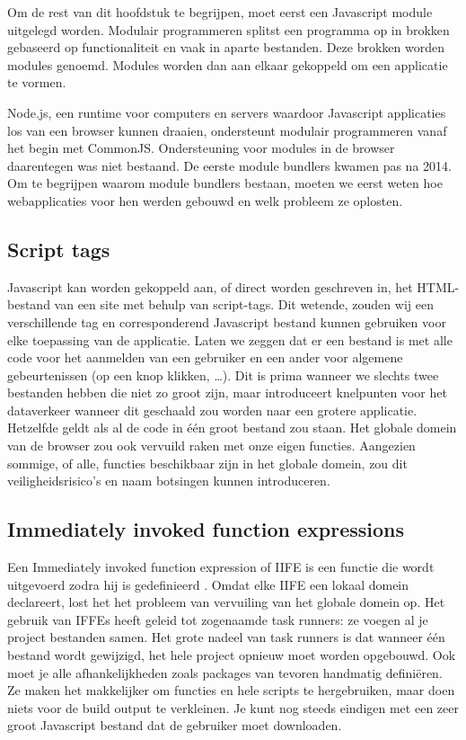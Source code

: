 Om de rest van dit hoofdstuk te begrijpen, moet eerst een \gls{Javascript} module uitgelegd worden. Modulair programmeren splitst een programma op in brokken gebaseerd op functionaliteit en vaak in aparte bestanden. Deze brokken worden modules genoemd. Modules worden dan aan elkaar gekoppeld om een applicatie te vormen. \autocite{webpack-no-dateB} \autocite{mozilla-2021A}

Node.js, een runtime voor computers en servers waardoor \gls{Javascript} applicaties los van een browser kunnen draaien, ondersteunt modulair programmeren vanaf het begin met CommonJS. Ondersteuning voor modules in de browser daarentegen was niet bestaand. De eerste module bundlers kwamen pas na 2014. Om te begrijpen waarom module bundlers bestaan, moeten we eerst weten hoe webapplicaties voor hen werden gebouwd en welk probleem ze oplosten. \autocite{webpack-no-dateA}

\subsection{Script tags}

\gls{Javascript} kan worden gekoppeld aan, of direct worden geschreven in, het \gls{HTML}-bestand van een site met behulp van script-tags. Dit wetende, zouden wij een verschillende tag en corresponderend \gls{Javascript} bestand kunnen gebruiken voor elke toepassing van de applicatie. Laten we zeggen dat er een bestand is met alle code voor het aanmelden van een gebruiker en een ander voor algemene gebeurtenissen (op een knop klikken, \ldots). Dit is prima wanneer we slechts twee bestanden hebben die niet zo groot zijn, maar introduceert knelpunten voor het dataverkeer wanneer dit geschaald zou worden naar een grotere applicatie. Hetzelfde geldt als al de code in één groot bestand zou staan. Het globale domein van de browser zou ook vervuild raken met onze eigen functies. Aangezien sommige, of alle, functies beschikbaar zijn in het globale domein, zou dit veiligheidsrisico's en naam botsingen kunnen introduceren. 



\subsection{Immediately invoked function expressions}

Een Immediately invoked function expression of IIFE is een functie die wordt uitgevoerd zodra hij is gedefinieerd \autocite{mozilla-2021B}. Omdat elke IIFE een lokaal domein declareert, lost het het probleem van vervuiling van het globale domein op. Het gebruik van IFFEs heeft geleid tot zogenaamde task runners: ze voegen al je project bestanden samen. Het grote nadeel van task runners is dat wanneer één bestand wordt gewijzigd, het hele project opnieuw moet worden opgebouwd. Ook moet je alle afhankelijkheden zoals packages van tevoren handmatig definiëren. Ze maken het makkelijker om functies en hele scripts te hergebruiken, maar doen niets voor de build output te verkleinen. Je kunt nog steeds eindigen met een zeer groot Javascript bestand dat de gebruiker moet downloaden. 


